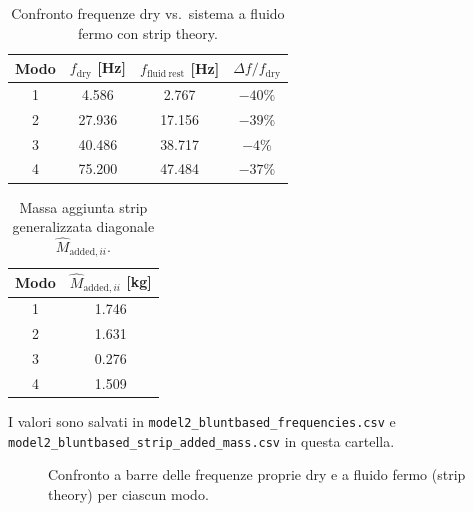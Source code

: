 \documentclass[11pt,a4paper]{article}
\begin{document}
\begin{table}[H]
  \centering
  \caption{Confronto frequenze dry vs.\ sistema a fluido fermo con strip theory.}
  \label{tab:wet-freq}
  \begin{tabular}{cccc}
    \toprule
    Modo & $f_\mathrm{dry}$ [Hz] & $f_\mathrm{fluid\ rest}$ [Hz] & $\Delta f / f_\mathrm{dry}$ \\
    \midrule
    1 & 4.586 & 2.767 & $-40\%$ \\
    2 & 27.936 & 17.156 & $-39\%$ \\
    3 & 40.486 & 38.717 & $-4\%$ \\
    4 & 75.200 & 47.484 & $-37\%$ \\
    \bottomrule
  \end{tabular}
\end{table}

\begin{table}[H]
  \centering
  \caption{Massa aggiunta strip generalizzata diagonale $\hat{M}_{\mathrm{added},ii}$.}
  \label{tab:madd}
  \begin{tabular}{cc}
    \toprule
    Modo & $\hat{M}_{\mathrm{added},ii}$ [kg] \\
    \midrule
    1 & 1.746 \\
    2 & 1.631 \\
    3 & 0.276 \\
    4 & 1.509 \\
    \bottomrule
  \end{tabular}
\end{table}

I valori sono salvati in
\texttt{model2\_bluntbased\_frequencies.csv} e
\texttt{model2\_bluntbased\_strip\_added\_mass.csv} in questa cartella.

\begin{figure}[H]
  \centering
  \caption{Confronto a barre delle frequenze proprie dry e a fluido fermo (strip theory)
  per ciascun modo.}
\end{figure}
\end{document}
